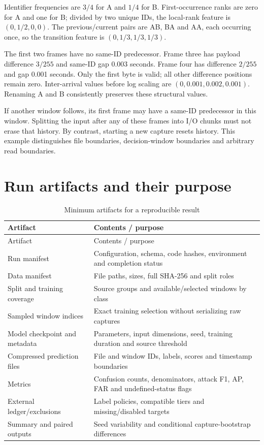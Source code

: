 \documentclass[12pt,a4paper,oneside,openany]{extbook}
\begin{document}
Identifier frequencies are $3/4$ for A and $1/4$ for B. First-occurrence ranks are zero for A and one for B; divided by two unique IDs, the local-rank feature is $(0,1/2,0,0)$. The previous/current pairs are AB, BA and AA, each occurring once, so the transition feature is $(0,1/3,1/3,1/3)$.

The first two frames have no same-ID predecessor. Frame three has payload difference $3/255$ and same-ID gap 0.003 seconds. Frame four has difference $2/255$ and gap 0.001 seconds. Only the first byte is valid; all other difference positions remain zero. Inter-arrival values before log scaling are $(0,0.001,0.002,0.001)$. Renaming A and B consistently preserves these structural values.

If another window follows, its first frame may have a same-ID predecessor in this window. Splitting the input after any of these frames into I/O chunks must not erase that history. By contrast, starting a new capture resets history. This example distinguishes file boundaries, decision-window boundaries and arbitrary read boundaries.

\section{Run artifacts and their purpose}
\begin{longtable}{P{4.7cm}P{8.2cm}}
\caption{Minimum artifacts for a reproducible result}\label{tab:artifacts}\\\toprule
Artifact & Contents / purpose\\\midrule\endfirsthead\toprule Artifact & Contents / purpose\\\midrule\endhead
Run manifest & Configuration, schema, code hashes, environment and completion status\\
Data manifest & File paths, sizes, full SHA-256 and split roles\\
Split and training coverage & Source groups and available/selected windows by class\\
Sampled window indices & Exact training selection without serializing raw captures\\
Model checkpoint and metadata & Parameters, input dimensions, seed, training duration and source threshold\\
Compressed prediction files & File and window IDs, labels, scores and timestamp boundaries\\
Metrics & Confusion counts, denominators, attack F1, AP, FAR and undefined-status flags\\
External ledger/exclusions & Label policies, compatible tiers and missing/disabled targets\\
Summary and paired outputs & Seed variability and conditional capture-bootstrap differences\\\bottomrule
\end{longtable}
\end{document}
